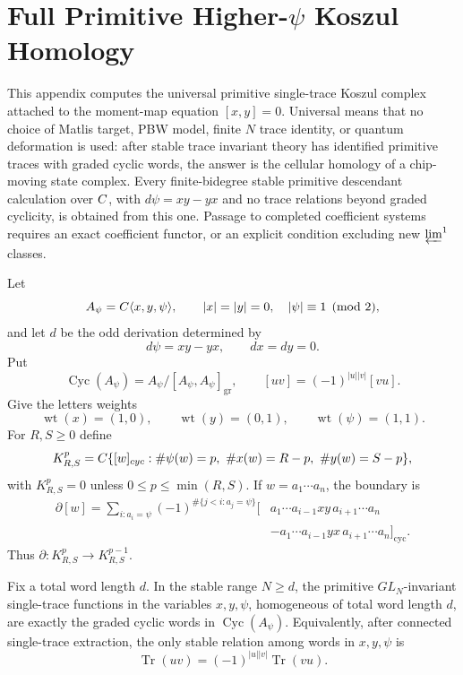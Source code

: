 
\section{\texorpdfstring{Full Primitive Higher-\(\psi\) Koszul Homology}{Full Primitive Higher-psi Koszul Homology}}
\label{sec:app-full-psi-homology}

This appendix computes the universal primitive single-trace Koszul complex
attached to the moment-map equation \([x,y]=0\).  Universal means that no
choice of Matlis target, PBW model, finite \(N\) trace identity, or quantum
deformation is used: after stable trace invariant theory has identified
primitive traces with graded cyclic words, the answer is the cellular homology
of a chip-moving state complex.  Every finite-bidegree stable primitive
descendant calculation over \(C\), with \(d\psi=xy-yx\) and no trace
relations beyond graded cyclicity, is obtained from this one.  Passage to
completed coefficient systems requires an exact coefficient functor, or an
explicit condition excluding new \(\varprojlim^1\) classes.

\begin{defn}
\label{def:app-full-psi-complex}
  Let
	  \[
	    A_\psi=C\langle x,y,\psi\rangle,\qquad
	    |x|=|y|=0,\quad |\psi|\equiv1\pmod 2,
	  \]
  and let \(d\) be the odd derivation determined by
  \[
    d\psi=xy-yx,\qquad dx=dy=0.
  \]
  Put
  \[
    \operatorname{Cyc}(A_\psi)
      =A_\psi/[A_\psi,A_\psi]_{\mathrm{gr}},
      \qquad [uv]=(-1)^{|u||v|}[vu].
  \]
  Give the letters weights
  \[
    \operatorname{wt}(x)=(1,0),\qquad
    \operatorname{wt}(y)=(0,1),\qquad
    \operatorname{wt}(\psi)=(1,1).
  \]
  For \(R,S\geq0\) define
  \[
    K^p_{R,S}
      =
      C\{[w]_{cyc}:
        \#\psi(w)=p,\ \#x(w)=R-p,\ \#y(w)=S-p\},
  \]
  with \(K^p_{R,S}=0\) unless \(0\leq p\leq\min(R,S)\).  If
  \(w=a_1\cdots a_n\), the boundary is
  \[
  \begin{aligned}
    \partial[w]
      =
      \sum_{i:a_i=\psi}(-1)^{\#\{j<i:a_j=\psi\}}
      [&a_1\cdots a_{i-1}xy\,a_{i+1}\cdots a_n\\
       &-a_1\cdots a_{i-1}yx\,a_{i+1}\cdots a_n]_{\mathrm{cyc}} .
  \end{aligned}
  \]
  Thus \(\partial:K^p_{R,S}\to K^{p-1}_{R,S}\).
\end{defn}

\begin{lem}
\label{lem:app-full-stable-super-traces}
  Fix a total word length \(d\).  In the stable range \(N\geq d\), the
  primitive \(GL_N\)-invariant single-trace functions in the variables
  \(x,y,\psi\), homogeneous of total word length \(d\), are exactly the
  graded cyclic words in \(\operatorname{Cyc}(A_\psi)\).  Equivalently, after
  connected single-trace extraction, the only stable relation among words in
  \(x,y,\psi\) is
  \[
    \operatorname{Tr}(uv)=(-1)^{|u||v|}\operatorname{Tr}(vu).
  \]
\end{lem}

